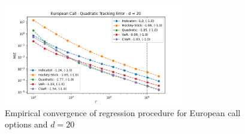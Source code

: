\begin{figure}[ht]
    \centering
    \includegraphics[width=0.7\textwidth]{./project1/figures/figure3.png}
    \caption{Empirical convergence of regression procedure for European call options and $d=20$}
    \label{fig1:reg_lb} 
\end{figure}

